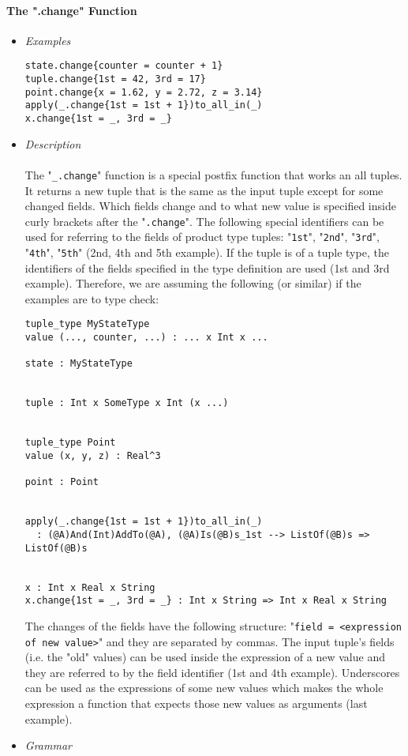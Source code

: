 \documentclass[diploma]{softlab-thesis}
\begin{document}
\paragraph{The ".change" Function}

\begin{itemize}

\item \textit{Examples}

\begin{verbatim}
state.change{counter = counter + 1}
tuple.change{1st = 42, 3rd = 17}
point.change{x = 1.62, y = 2.72, z = 3.14}
apply(_.change{1st = 1st + 1})to_all_in(_)
x.change{1st = _, 3rd = _}
\end{verbatim}

\item \textit{Description}
\\\\
The "\verb|_.change|" function is a special postfix function that works an all
tuples. It returns a new tuple that is the same as the input tuple except for
some changed fields. Which fields change and to what new value is specified
inside curly brackets after the "\verb|.change|". The following special
identifiers can be used for referring to the fields of product type tuples:
"\verb|1st|", "\verb|2nd|", "\verb|3rd|", "\verb|4th|", "\verb|5th|"
(2nd, 4th and 5th example). If the tuple is of a tuple type, the identifiers of
the fields specified in the type definition are used (1st and 3rd example).
Therefore, we are assuming the following (or similar) if the examples are to
type check:

\begin{verbatim}
tuple_type MyStateType
value (..., counter, ...) : ... x Int x ...

state : MyStateType


tuple : Int x SomeType x Int (x ...)


tuple_type Point
value (x, y, z) : Real^3

point : Point


apply(_.change{1st = 1st + 1})to_all_in(_)
  : (@A)And(Int)AddTo(@A), (@A)Is(@B)s_1st --> ListOf(@B)s => ListOf(@B)s


x : Int x Real x String
x.change{1st = _, 3rd = _} : Int x String => Int x Real x String
\end{verbatim}

\newpage
The changes of the fields have the following structure:
"\verb|field = <expression of new value>|"
and they are separated by commas. The input tuple's fields (i.e. the
"old" values) can be used inside the expression of a new value and they are
referred to by the field identifier (1st and 4th example). Underscores can be
used as the expressions of some new values which makes the whole expression
a function that expects those new values as arguments (last example).
\item \textit{Grammar}


\end{itemize}
\end{document}
